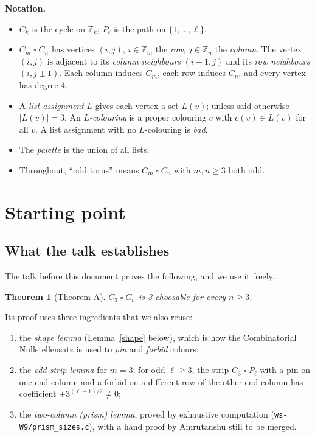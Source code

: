 \documentclass[11pt]{article}
\theoremstyle{plain}
\newtheorem{theorem}{Theorem}[section]
\theoremstyle{definition}
\theoremstyle{remark}
\newcommand{\T}{\mathbin{\square}}
\newcommand{\Z}{\mathbb{Z}}
\newcommand{\script}[1]{\texttt{#1}}
\begin{document}
\textbf{Notation.}
\begin{itemize}[nosep]
\item $C_k$ is the cycle on $\Z_k$; $P_\ell$ is the path on $\{1, \dots, \ell\}$.
\item $C_m \T C_n$ has vertices $(i, j)$, $i \in \Z_m$ the \emph{row}, $j \in \Z_n$ the \emph{column}. The vertex
$(i,j)$ is adjacent to its \emph{column neighbours} $(i \pm 1, j)$ and its \emph{row neighbours} $(i, j \pm 1)$.
Each column induces $C_m$, each row induces $C_n$, and every vertex has degree 4.
\item A \emph{list assignment} $L$ gives each vertex a set $L(v)$; unless said otherwise $|L(v)| = 3$. An
\emph{$L$-colouring} is a proper colouring $c$ with $c(v) \in L(v)$ for all $v$. A list assignment with no
$L$-colouring is \emph{bad}.
\item The \emph{palette} is the union of all lists.
\item Throughout, ``odd torus'' means $C_m \T C_n$ with $m, n \ge 3$ both odd.
\end{itemize}

\section{Starting point}\label{sec:start}

\subsection{What the talk establishes}

The talk before this document proves the following, and we use it freely.

\begin{theorem}[Theorem A]\label{thmA}
$C_3 \T C_n$ is 3-choosable for every $n \ge 3$.
\end{theorem}

Its proof uses three ingredients that we also reuse:
\begin{enumerate}[nosep]
\item the \emph{shape lemma} (Lemma~\ref{shape} below), which is how the Combinatorial Nullstellensatz is
used to \emph{pin} and \emph{forbid} colours;
\item the \emph{odd strip lemma} for $m = 3$: for odd $\ell \ge 3$, the strip $C_3 \T P_\ell$ with a pin on one
end column and a forbid on a different row of the other end column has coefficient $\pm 3^{(\ell-1)/2} \ne 0$;
\item the \emph{two-column (prism) lemma}, proved by exhaustive computation
(\script{ws-W9/prism\_sizes.c}), with a hand proof by Amrutanshu still to be merged.
\end{enumerate}
\end{document}
